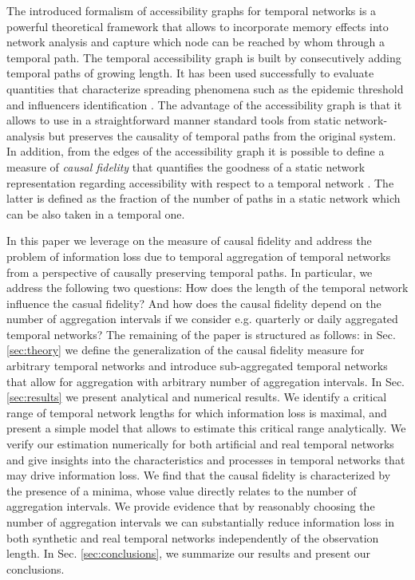 \documentclass[%
 reprint,
 amsmath,amssymb,
 aps,
]{revtex4-2}
\begin{document}
 

The introduced formalism of accessibility graphs for temporal networks \cite{lentz2013unfolding} is a powerful theoretical framework that allows to incorporate memory effects into network analysis and capture which node can be reached by whom through a temporal path. The %
temporal accessibility graph is built by consecutively adding temporal paths of growing length. It has been used successfully to evaluate quantities that characterize spreading phenomena such as the epidemic threshold \cite{valdano2015analytical} and  influencers identification \cite{bindi2018political}.
The advantage of the accessibility graph is that it allows to use in a straightforward manner standard tools from static network-analysis but preserves the causality of temporal paths from the original system. 
In addition, from the edges of the accessibility graph it is possible to define a  measure of \emph{causal fidelity} that  quantifies  the goodness of a static network representation regarding accessibility with respect to a temporal network \cite{lentz2013unfolding}.
The latter is defined as the fraction of the number of paths in a static network which can be also taken in a temporal one.

In this paper we leverage on the measure of causal fidelity and address the problem of information loss due to temporal aggregation of temporal networks from a perspective of causally preserving temporal paths. In particular, we address the following two questions: How does the length of the temporal network influence the casual fidelity? And how does the causal fidelity depend on the number of aggregation intervals if we consider e.g. quarterly or daily aggregated temporal networks? The remaining of the paper is structured as follows:
in Sec. \ref{sec:theory} we define the generalization of the causal fidelity measure for arbitrary temporal networks and introduce sub-aggregated temporal networks that allow for aggregation with arbitrary number of aggregation intervals. 
In Sec. \ref{sec:results} we present analytical and numerical results. 
We identify a critical range of temporal network lengths for which information loss is maximal, and present a simple model that allows to estimate this critical range analytically. 
We verify our estimation numerically for both artificial and real temporal networks and give insights into the characteristics and processes in temporal networks that may drive information loss.
We find that the causal fidelity is characterized by the presence of a minima, whose value directly relates to the number of aggregation intervals. 
We provide evidence that by reasonably choosing the number of aggregation intervals we can substantially reduce information loss in both synthetic and real temporal networks independently of the observation length.
In Sec. \ref{sec:conclusions}, we summarize our results and present our conclusions. 
\end{document}
